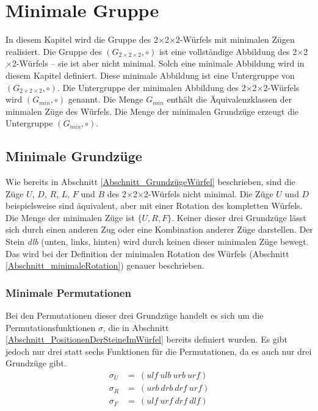 \documentclass[12pt,a4paper, usenames, dvipsnames]{article}
\theoremstyle{mystyle}
\theoremstyle{definition}
\newcommand{\Gtwo}{\ensuremath{G_{2\times 2\times 2}}}
\newcommand{\Ttwo}{2$\times$2$\times$2-}
\begin{document}
\section{Minimale Gruppe}
\label{Kapitel_MinUntergruppe}

In diesem Kapitel wird die Gruppe des \Ttwo Würfels mit minimalen Zügen realisiert. Die Gruppe des $(\Gtwo, \circ)$ ist eine vollständige Abbildung des \Ttwo Würfels -- sie ist aber nicht minimal. Solch eine minimale Abbildung wird in diesem Kapitel definiert. Diese minimale Abbildung ist eine Untergruppe von $(\Gtwo, \circ)$.
Die Untergruppe der minimalen Abbildung des \Ttwo Würfels wird $(G_{min}, \circ)$ genannt. Die Menge $G_{min}$ enthält die Äquivalenzklassen der minmalen Züge des Würfels.
Die Menge der minimalen Grundzüge erzeugt die Untergruppe $(G_{min}, \circ)$.

%
%
%
%
%
%
%
%
%
%
%
%
%
%
%
%
%
%
%
%
\subsection{Minimale Grundzüge}
\label{Abschnitt_MinimalePermutationen}
\label{Abschnitt_MinimaleGrundzüge}

Wie bereits in Abschnitt \ref{Abschnitt_GrundzügeWürfel} beschrieben, sind die Züge $U$, $D$, $R$, $L$, $F$ und $B$ des \Ttwo Würfels nicht minimal. Die Züge $U$ und $D$ beispielsweise sind äquivalent, aber mit einer Rotation des kompletten Würfels. 
Die Menge der minimalen Züge ist $\{ U, R, F\}$. Keiner dieser drei Grundzüge lässt sich durch einen anderen Zug oder eine Kombination anderer Züge darstellen. Der Stein \textit{dlb} (unten, links, hinten) wird durch keinen dieser minimalen Züge bewegt. Das wird bei der Definition der minimalen Rotation des Würfels (Abschnitt \ref{Abschnitt_minimaleRotation}) genauer beschrieben.

\subsubsection*{Minimale Permutationen}

Bei den Permutationen dieser drei Grundzüge handelt es sich um die Permutationsfunktionen $\sigma$, die in Abschnitt \ref{Abschnitt_PositionenDerSteineImWürfel} bereits definiert wurden. Es gibt jedoch nur drei statt sechs Funktionen für die Permutationen, da es auch nur drei Grundzüge gibt.
\begin{align*}
\sigma_U & =\ ( \textit{ulf} \ \textit{ulb} \ \textit{urb} \ \textit{urf} ) \\
\sigma_R & =\ ( \textit{urb} \ \textit{drb} \ \textit{drf} \ \textit{urf} ) \\
\sigma_F & =\ ( \textit{ulf} \ \textit{urf} \ \textit{drf} \ \textit{dlf} ) 
\end{align*}
\end{document}
